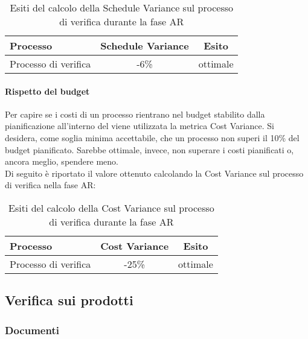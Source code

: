 \documentclass[PianoDiQualifica.tex]{subfiles}
\begin{document}
			\begin{table}[h]
				\centering
				\begin{tabular}{l c c}
					\hline
					\rule[-0.3cm]{0cm}{0.8cm}
					\textbf{Processo} & \textbf{Schedule Variance} & \textbf{Esito} \\
					\hline
					\rule[0cm]{0cm}{0.4cm}
					Processo di verifica & -6\% & ottimale \\
					\hline
				\end{tabular}
				\caption{Esiti del calcolo della Schedule Variance sul processo di verifica durante la fase AR}
			\end{table}		
		
			
			
		\paragraph{Rispetto del budget}
		
		Per capire se i costi di un processo rientrano nel budget stabilito dalla pianificazione all'interno del \PPdocRR{} viene utilizzata la metrica Cost Variance. Si desidera, come soglia minima accettabile, che un processo non superi il 10\% del budget pianificato. Sarebbe ottimale, invece, non superare i costi pianificati o, ancora meglio, spendere meno.\\
		Di seguito è riportato il valore ottenuto calcolando la Cost Variance sul processo di verifica nella fase AR:\\
		
		
		
		\begin{table}[h]
				\centering
				\begin{tabular}{l c c}
					\hline
					\rule[-0.3cm]{0cm}{0.8cm}
					\textbf{Processo} & \textbf{Cost Variance} & \textbf{Esito} \\
					\hline
					\rule[0cm]{0cm}{0.4cm}
					Processo di verifica & -25\% & ottimale \\
					\hline
				\end{tabular}
				\caption{Esiti del calcolo della Cost Variance sul processo di verifica durante la fase AR}
			\end{table}		
	
\subsection{Verifica sui prodotti}
	\subsubsection{Documenti}
	\newpage
\end{document}
